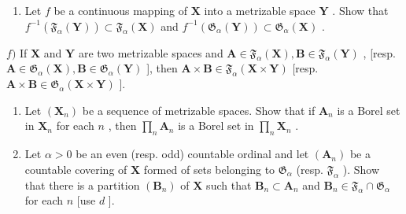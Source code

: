 \begin{enumerate}
\def\labelenumi{\alph{enumi})}
\setcounter{enumi}{4}
\tightlist
\item
  Let \(f\) be a continuous mapping of \(\mathbf{X}\) into a metrizable space \(\mathbf{Y}\) . Show that \(f^{-1}(\mathfrak{F}_{\alpha}(\mathbf{Y})) \subset \mathfrak{F}_{\alpha}(\mathbf{X})\) and \(f^{-1}(\mathfrak{G}_{\alpha}(\mathbf{Y})) \subset \mathfrak{G}_{\alpha}(\mathbf{X})\) .
\end{enumerate}

\(f)\) If \(\mathbf{X}\) and \(\mathbf{Y}\) are two metrizable spaces and \(\mathbf{A} \in \mathfrak{F}_{\alpha}(\mathbf{X}), \mathbf{B} \in \mathfrak{F}_{\alpha}(\mathbf{Y})\) , {[}resp. \(\mathbf{A} \in \mathfrak{G}_{\alpha}(\mathbf{X}), \mathbf{B} \in \mathfrak{G}_{\alpha}(\mathbf{Y})\) {]}, then \(\mathbf{A} \times \mathbf{B} \in \mathfrak{F}_{\alpha}(\mathbf{X} \times \mathbf{Y})\) {[}resp. \(\mathbf{A} \times \mathbf{B} \in \mathfrak{G}_{\alpha}(\mathbf{X} \times \mathbf{Y})\) {]}.

\begin{enumerate}
\def\labelenumi{\alph{enumi})}
\setcounter{enumi}{6}
\item
  Let \((\mathbf{X}_n)\) be a sequence of metrizable spaces. Show that if \(\mathbf{A}_n\) is a Borel set in \(\mathbf{X}_n\) for each \(n\) , then \(\prod_{n} \mathbf{A}_n\) is a Borel set in \(\prod_{n} \mathbf{X}_n\) .
\item
  Let \(\alpha > 0\) be an even (resp. odd) countable ordinal and let \((\mathbf{A}_n)\) be a countable covering of \(\mathbf{X}\) formed of sets belonging to \(\mathfrak{G}_{\alpha}\) (resp. \(\mathfrak{F}_{\alpha}\) ). Show that there is a partition \((\mathbf{B}_n)\) of \(\mathbf{X}\) such that \(\mathbf{B}_n \subset \mathbf{A}_n\) and \(\mathbf{B}_n \in \mathfrak{F}_{\alpha} \cap \mathfrak{G}_{\alpha}\) for each \(n\) {[}use \(d\) {]}.
\end{enumerate}

